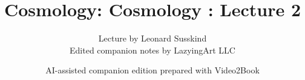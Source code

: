 \documentclass[11pt,oneside]{book}
\begin{document}
\frontmatter
\title{Cosmology: Cosmology : Lecture 2}
\author{Lecture by Leonard Susskind\\Edited companion notes by LazyingArt LLC}
\date{AI-assisted companion edition prepared with Video2Book}
\maketitle
\clearpage
\mainmatter

\end{document}
